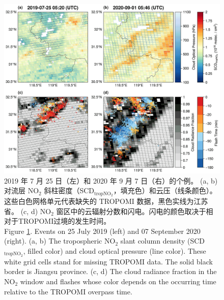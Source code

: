 \begin{figure}[htbp]
    \centering
    \includegraphics[width=12cm]{./figures/flash_scd.png}
    \caption{
    2019 年 7 月 25 日（左）和 2020 年 9 月 7 日（右）的个例。
    (a, b) 对流层 NO$_2$ 斜柱密度（SCD$_\textrm{tropNO$_2$}$，填充色）和云压（线条颜色）。
    这些白色网格单元代表缺失的 TROPOMI 数据，黑色实线为江苏省。
     (c, d) NO$_2$ 窗区中的云辐射分数和闪电。闪电的颜色取决于相对于TROPOMI过境的发生时间。\\
    Figure \ref{fig:flash_scd}. Events on 25 July 2019 (left) and 07 September 2020 (right).
    (a, b) The tropospheric NO$_2$ slant column density (SCD$_\textrm{tropNO$_2$}$, filled color) and cloud optical pressure (line color).
    These white grid cells stand for missing TROPOMI data.
    The solid black border is Jiangsu province.
    (c, d) The cloud radiance fraction in the NO$_2$ window and flashes whose color depends on the occurring time relative to the TROPOMI overpass time.
    }
    \label{fig:flash_scd}
\end{figure}


